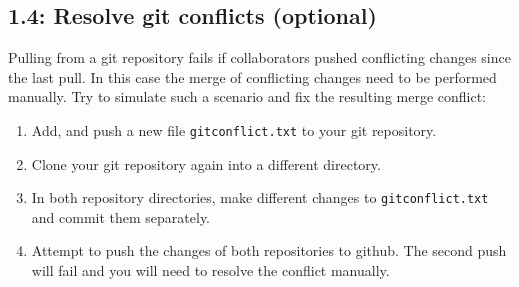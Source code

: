 \documentclass[english]{article}
\begin{document}
\subsection{1.4: Resolve git conflicts (optional)}
Pulling from a git repository fails if collaborators pushed conflicting changes since the last pull. In this case the merge of conflicting changes need to be performed manually. Try to simulate such a scenario and fix the resulting merge conflict:
\begin{enumerate}
\item Add, and push a new file \texttt{gitconflict.txt} to your git repository.
\item Clone your git repository again into a different directory.
\item In both repository directories, make different changes to \texttt{gitconflict.txt} and commit them separately.
\item Attempt to push the changes of both repositories to github. The second push will fail and you will need to resolve the conflict manually.
\end{enumerate}
\end{document}
